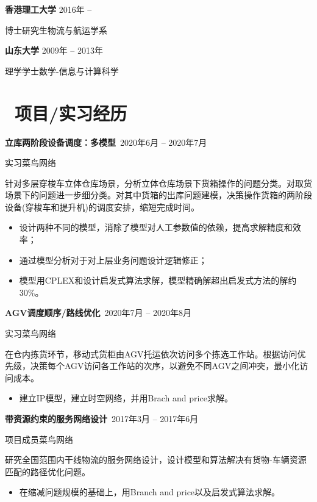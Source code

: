 \documentclass[11pt]{article}
\begin{document}
\textbf{香港理工大学} \hfill 2016年 -- 

博士研究生\quad 物流与航运学系

\textbf{山东大学} \hfill 2009年 -- 2013年

理学学士\quad 数学-信息与计算科学


\section{\makebox[\widthof{\faGraduationCap}][c]{\color{CVBlue}\faUsers}\ 项目/实习经历}

\textbf{立库两阶段设备调度：多模型}\  \hfill 2020年6月 -- 2020年7月

实习\quad 菜鸟网络

针对多层穿梭车立体仓库场景，分析立体仓库场景下货箱操作的问题分类。对取货场景下的问题进一步细分类。对其中货箱的出库问题建模，决策操作货箱的两阶段设备(穿梭车和提升机)的调度安排，缩短完成时间。

\begin{itemize}
  \item 设计两种不同的模型，消除了模型对人工参数值的依赖，提高求解精度和效率；
  \item 通过模型分析对于对上层业务问题设计逻辑修正；
  \item 模型用CPLEX和设计启发式算法求解，模型精确解超出启发式方法的解约30\%。
\end{itemize}

\textbf{AGV调度顺序/路线优化}\  \hfill 2020年7月 -- 2020年8月

实习\quad 菜鸟网络

在仓内拣货环节，移动式货柜由AGV托运依次访问多个拣选工作站。根据访问优先级，决策每个AGV访问各工作站的次序，以避免不同AGV之间冲突，最小化访问成本。

\begin{itemize}
  \item 建立IP模型，建立时空网络，并用Brach and price求解。
\end{itemize}

\textbf{带资源约束的服务网络设计}\  \hfill 2017年3月 -- 2017年6月

项目成员\quad 菜鸟网络

研究全国范围内干线物流的服务网络设计，设计模型和算法解决有货物-车辆资源匹配的路径优化问题。

\begin{itemize}
  \item 在缩减问题规模的基础上，用Branch and price以及启发式算法求解。
\end{itemize}
\end{document}
